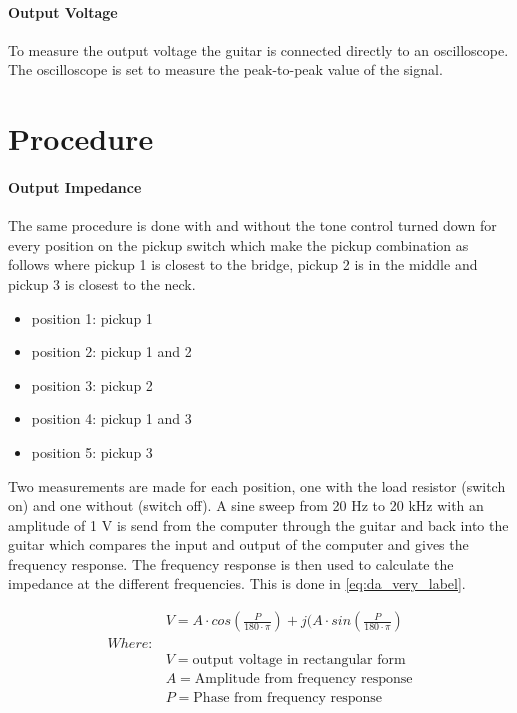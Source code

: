 \paragraph{Output Voltage}
To measure the output voltage the guitar is connected directly to an oscilloscope. The oscilloscope is set to measure the peak-to-peak value of the signal.

\section{Procedure}
\paragraph{Output Impedance}
The same procedure is done with and without the tone control turned down for every position on the pickup switch which make the pickup combination as follows where pickup 1 is closest to the bridge, pickup 2 is in the middle and pickup 3 is closest to the neck. 

\begin{itemize}
	\item position 1: pickup 1
	\item position 2: pickup 1 and 2
	\item position 3: pickup 2
	\item position 4: pickup 1 and 3
	\item position 5: pickup 3
\end{itemize}


Two measurements are made for each position, one with the load resistor (switch on) and one without (switch off). A sine sweep from 20 Hz to 20 kHz with an amplitude of 1 V is send from the computer through the guitar and back into the guitar which compares the input and output of the computer and gives the frequency response. The frequency response is then used to calculate the impedance at the different frequencies. This is done in \autoref{eq:da_very_label}.

\begin{align}
	&V = A\cdot cos(\frac{P}{180\cdot\pi})+j(A\cdot sin(\frac{P}{180\cdot\pi}) \\
	Where:& \nonumber \\
	&V = \text{output voltage in rectangular form} \nonumber\\
	&A = \text{Amplitude from frequency response} \nonumber\\
	&P = \text{Phase from frequency response} \nonumber 
	\label{eq:da_very_label}
\end{align}

